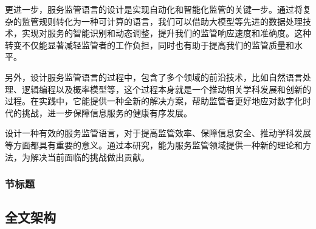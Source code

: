 更进一步，服务监管语言的设计是实现自动化和智能化监管的关键一步。通过将复杂的监管规则转化为一种可计算的语言，我们可以借助大模型等先进的数据处理技术，实现对服务的智能识别和动态调整，提升我们的监管响应速度和准确度。这种转变不仅能显著减轻监管者的工作负担，同时也有助于提高我们的监管质量和水平。

另外，设计服务监管语言的过程中，包含了多个领域的前沿技术，比如自然语言处理、逻辑编程以及概率模型等，这个过程本身就是一个推动相关学科发展和创新的过程。在实践中，它能提供一种全新的解决方案，帮助监管者更好地应对数字化时代的挑战，进一步保障信息服务的健康有序发展。

设计一种有效的服务监管语言，对于提高监管效率、保障信息安全、推动学科发展等方面都具有重要的意义。通过本研究，能为服务监管领域提供一种新的理论和方法，为解决当前面临的挑战做出贡献。

\subsubsection{节标题}

\subsection{全文架构}